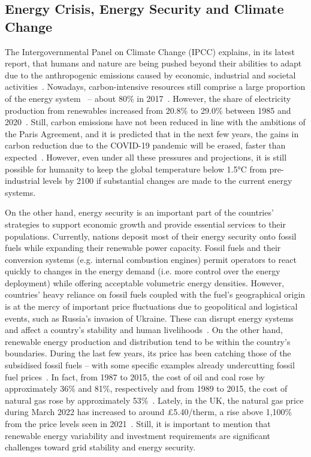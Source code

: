 \subsection{Energy Crisis, Energy Security and Climate Change}

The Intergovernmental Panel on Climate Change (IPCC) explains, in its latest report, that humans and nature are being pushed beyond their abilities to adapt due to the anthropogenic emissions caused by economic, industrial and societal activities~\cite{IPCC2022Portner}. Nowadays, carbon-intensive resources still comprise a large proportion of the energy system~\cite{IPCC2022Portner} – about 80\% in 2017~\cite{raturi2019renewables}. However, the share of electricity production from renewables increased from 20.8\% to 29.0\% between 1985 and 2020~\cite{BP2021bp}. Still, carbon emissions have not been reduced in line with the ambitions of the Paris Agreement, and it is predicted that in the next few years, the gains in carbon reduction due to the COVID-19 pandemic will be erased, faster than expected~\cite{WEO2021IEA}. However, even under all these pressures and projections, it is still possible for humanity to keep the global temperature below 1.5°C from pre-industrial levels by 2100 if substantial changes are made to the current energy systems.

On the other hand, energy security is an important part of the countries’ strategies to support economic growth and provide essential services to their populations. Currently, nations deposit most of their energy security onto fossil fuels while expanding their renewable power capacity. Fossil fuels and their conversion systems (e.g. internal combustion engines) permit operators to react quickly to changes in the energy demand (i.e. more control over the energy deployment) while offering acceptable volumetric energy densities. However, countries’ heavy reliance on fossil fuels coupled with the fuel’s geographical origin is at the mercy of important price fluctuations due to geopolitical and logistical events, such as Russia’s invasion of Ukraine. These can disrupt energy systems and affect a country’s stability and human livelihoods~\cite{bhattacharyya2009fossil,russiagas}. On the other hand, renewable energy production and distribution tend to be within the country's boundaries. During the last few years, its price has been catching those of the subsidised fossil fuels – with some specific examples already undercutting fossil fuel prices~\cite{IRENA2021Renewable}. In fact, from 1987 to 2015, the cost of oil and coal rose by approximately 36\% and 81\%, respectively and from 1989 to 2015, the cost of natural gas rose by approximately 53\%~\cite{BP2016bp}. Lately, in the UK, the natural gas price during March 2022 has increased to around £5.40/therm, a rise above 1,100\% from the price levels seen in 2021~\cite{T2022UKNatureGas}. Still, it is important to mention that renewable energy variability and investment requirements are significant challenges toward grid stability and energy security.

